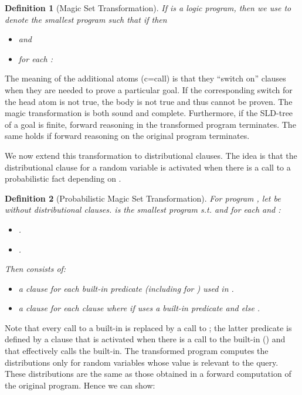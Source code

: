 \documentclass{tlp}
\newtheorem{definition}{Definition}
\begin{document}
\begin{definition}[Magic Set Transformation]
  \label{def:magicsets}
  If  is a logic program, then we use  to denote the
  smallest program such that if  then
  \begin{itemize}
  \item  and
  \item for each : 
  \end{itemize}
\end{definition}

The meaning of the additional  atoms (c=call) is that
they ``switch on'' clauses when they are needed to prove a particular
goal. If the corresponding switch for the head atom is not true, the
body is not true and thus cannot be proven.  The magic transformation
is both sound and complete. Furthermore, if the SLD-tree of a goal is
finite, forward reasoning in the transformed program terminates. The
same holds if forward reasoning on the original program terminates.

We now extend this transformation to distributional clauses. The idea
is that the distributional clause for a random variable  is
activated  when there is a call to a probabilistic fact
 depending on .

\begin{definition}[Probabilistic Magic Set Transformation]
  \label{def:pmagicsets}
  For program , let  be  without distributional clauses.
   is the smallest program s.t.   and for each  and :
  \begin{itemize}
  \item .
  \item .
  \end{itemize}
   Then  consists of:
  \begin{itemize}
  \item a clause  for each
    built-in predicate (including  for
    ) used in
    .

 \item a clause  for each clause   where  if  uses a built-in
    predicate and else .
  \end{itemize}
\end{definition}

Note that every call to a built-in  is replaced by a call
to ; the latter predicate is defined by a clause that
is activated when there is a call to the built-in ()
and that effectively calls the built-in.  The transformed program
computes the distributions only for random variables whose value is
relevant to the query. These distributions are the same as those
obtained in a forward computation of the original program. Hence we
can show:
\end{document}
